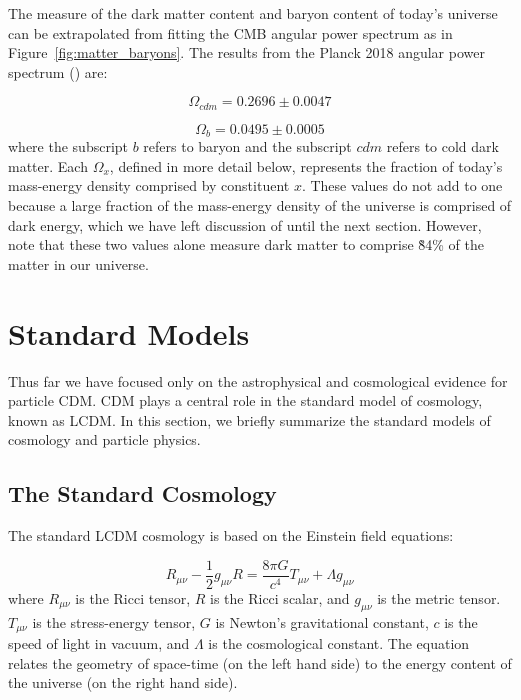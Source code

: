 The measure of the dark matter content and baryon content of today's universe can be extrapolated from fitting the \ac{CMB} angular power spectrum as in Figure~\ref{fig:matter_baryons}. The results from the Planck 2018 angular power spectrum (\cite{Planck2018}) are: 

\begin{equation}
\Omega_{cdm} = 0.2696 \pm 0.0047
\end{equation}

\begin{equation}
\Omega_{b}  = 0.0495 \pm 0.0005 
\end{equation}
where the subscript $b$ refers to baryon and the subscript $cdm$ refers to cold dark matter. Each $\Omega_{x}$, defined in more detail below, represents the fraction of today's mass-energy density comprised by constituent $x$. These values do not add to one because a large fraction of the mass-energy density of the universe is comprised of dark energy, which we have left discussion of until the next section. However, note that these two values alone measure dark matter to comprise \~84\% of the matter in our universe. 



\section{Standard Models}
Thus far we have focused only on the astrophysical and cosmological evidence for particle \ac{CDM}. \ac{CDM} plays a central role in the standard model of cosmology, known as \ac{LCDM}. In this section, we briefly summarize the standard models of cosmology and particle physics. 


\subsection{The Standard Cosmology}
The standard \ac{LCDM} cosmology is based on the Einstein field equations:

\begin{equation}
R_{\mu \nu} - \frac{1}{2} g_{\mu \nu} R = \frac{8 \pi G}{c^{4}} T_{\mu \nu} + \Lambda g_{\mu\nu}
\end{equation}
where $R_{\mu \nu}$ is the Ricci tensor, $R$ is the Ricci scalar, and $g_{\mu\nu}$ is the metric tensor. $T_{\mu \nu}$ is the stress-energy tensor, $G$ is Newton's gravitational constant, $c$ is the speed of light in vacuum, and $\Lambda$ is the cosmological constant. The equation relates the geometry of space-time (on the left hand side) to the energy content of the universe (on the right hand side). 


